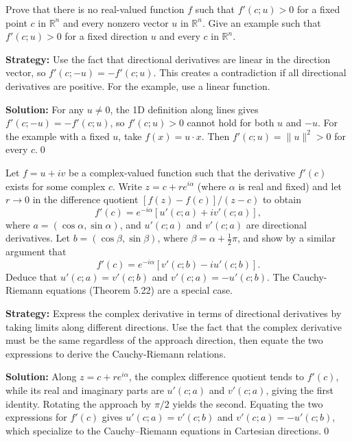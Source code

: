 \begin{problembox}
Prove that there is no real-valued function \( f \) such that \( f'(c; u) > 0 \) for a fixed point \( c \) in \( \mathbb{R}^n \) and every nonzero vector \( u \) in \( \mathbb{R}^n \). Give an example such that \( f'(c; u) > 0 \) for a fixed direction \( u \) and every \( c \) in \( \mathbb{R}^n \).
\end{problembox}

\noindent\textbf{Strategy:} Use the fact that directional derivatives are linear in the direction vector, so \( f'(c; -u) = -f'(c; u) \). This creates a contradiction if all directional derivatives are positive. For the example, use a linear function.

\bigskip\noindent\textbf{Solution:}
For any $u\ne0$, the 1D definition along lines gives $f'(c;-u)=-f'(c;u)$, so $f'(c;u)>0$ cannot hold for both $u$ and $-u$. For the example with a fixed $u$, take $f(x)=u\cdot x$. Then $f'(c;u)=\|u\|^2>0$ for every $c$.\qed


\begin{problembox}
Let \( f = u + iv \) be a complex-valued function such that the derivative \( f'(c) \) exists for some complex \( c \). Write \( z = c + re^{i\alpha} \) (where \( \alpha \) is real and fixed) and let \( r \to 0 \) in the difference quotient \( [f(z) - f(c)]/(z - c) \) to obtain
\[f'(c) = e^{-i\alpha}[u'(c; a) + iv'(c; a)],\]
where \( a = (\cos \alpha, \sin \alpha) \), and \( u'(c; a) \) and \( v'(c; a) \) are directional derivatives. Let \( b = (\cos \beta, \sin \beta) \), where \( \beta = \alpha + \frac{1}{2}\pi \), and show by a similar argument that
\[f'(c) = e^{-i\alpha}[v'(c; b) - iu'(c; b)].\]
Deduce that \( u'(c; a) = v'(c; b) \) and \( v'(c; a) = -u'(c; b) \). The Cauchy-Riemann equations (Theorem 5.22) are a special case.
\end{problembox}

\noindent\textbf{Strategy:} Express the complex derivative in terms of directional derivatives by taking limits along different directions. Use the fact that the complex derivative must be the same regardless of the approach direction, then equate the two expressions to derive the Cauchy-Riemann relations.

\bigskip\noindent\textbf{Solution:}
Along $z=c+re^{i\alpha}$, the complex difference quotient tends to $f'(c)$, while its real and imaginary parts are $u'(c;a)$ and $v'(c;a)$, giving the first identity. Rotating the approach by $\pi/2$ yields the second. Equating the two expressions for $f'(c)$ gives $u'(c;a)=v'(c;b)$ and $v'(c;a)=-u'(c;b)$, which specialize to the Cauchy–Riemann equations in Cartesian directions.\qed
